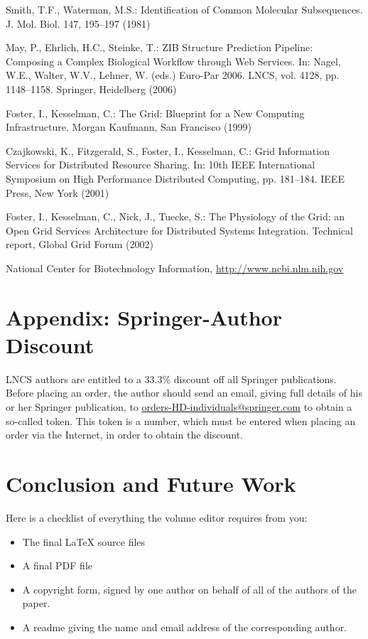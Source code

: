 \documentclass[runningheads,a4paper]{llncs}
\begin{document}
\begin{thebibliography}{4}

 Smith, T.F., Waterman, M.S.: Identification of Common Molecular
Subsequences. J. Mol. Biol. 147, 195--197 (1981)

 May, P., Ehrlich, H.C., Steinke, T.: ZIB Structure Prediction Pipeline:
Composing a Complex Biological Workflow through Web Services. In: Nagel,
W.E., Walter, W.V., Lehner, W. (eds.) Euro-Par 2006. LNCS, vol. 4128,
pp. 1148--1158. Springer, Heidelberg (2006)

 Foster, I., Kesselman, C.: The Grid: Blueprint for a New Computing
Infrastructure. Morgan Kaufmann, San Francisco (1999)

 Czajkowski, K., Fitzgerald, S., Foster, I., Kesselman, C.: Grid
Information Services for Distributed Resource Sharing. In: 10th IEEE
International Symposium on High Performance Distributed Computing, pp.
181--184. IEEE Press, New York (2001)

 Foster, I., Kesselman, C., Nick, J., Tuecke, S.: The Physiology of the
Grid: an Open Grid Services Architecture for Distributed Systems
Integration. Technical report, Global Grid Forum (2002)

 National Center for Biotechnology Information, \url{http://www.ncbi.nlm.nih.gov}

\end{thebibliography}


\section*{Appendix: Springer-Author Discount}

LNCS authors are entitled to a 33.3\% discount off all Springer
publications. Before placing an order, the author should send an email, 
giving full details of his or her Springer publication,
to \url{orders-HD-individuals@springer.com} to obtain a so-called token. This token is a
number, which must be entered when placing an order via the Internet, in
order to obtain the discount.

\section{Conclusion and Future Work}
Here is a checklist of everything the volume editor requires from you:


\begin{itemize}
\settowidth{\leftmargin}{{\Large$\square$}}\advance\leftmargin{}
\itemsep8pt\relax
\renewcommand\labelitemi{{\lower1.5pt\hbox{\Large$\square$}}}

\item The final \LaTeX{} source files
\item A final PDF file
\item A copyright form, signed by one author on behalf of all of the
authors of the paper.
\item A readme giving the name and email address of the
corresponding author.
\end{itemize}
\end{document}
